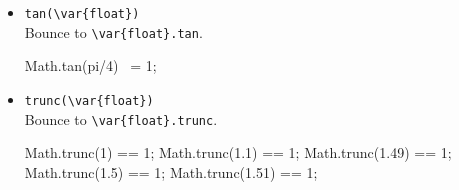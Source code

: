 \begin{itemize}
\item \lstinline|tan(\var{float})|\\
  Bounce to \lstinline|\var{float}.tan|.
\begin{urbiassert}
Math.tan(pi/4) ~= 1;
\end{urbiassert}

\item \lstinline|trunc(\var{float})|\\
  Bounce to \lstinline|\var{float}.trunc|.
\begin{urbiassert}
Math.trunc(1) == 1;
Math.trunc(1.1) == 1;
Math.trunc(1.49) == 1;
Math.trunc(1.5) == 1;
Math.trunc(1.51) == 1;
\end{urbiassert}
\end{itemize}


